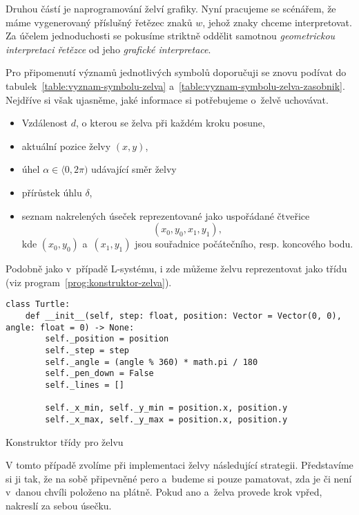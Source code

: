 Druhou částí je naprogramování želví grafiky. Nyní pracujeme se scénářem, že máme vygenerovaný příslušný řetězec znaků $w$, jehož znaky chceme interpretovat. Za účelem jednoduchosti se pokusíme striktně oddělit samotnou \emph{geometrickou interpretaci řetězce} od jeho \emph{grafické interpretace}.

Pro připomenutí významů jednotlivých symbolů doporučuji se znovu podívat do tabulek~\ref{table:vyznam-symbolu-zelva} a~\ref{table:vyznam-symbolu-zelva-zasobnik}. Nejdříve si však ujasněme, jaké informace si potřebujeme o~želvě uchovávat.
\begin{itemize}
    \item Vzdálenost $d$, o kterou se želva při každém kroku posune,
    \item aktuální pozice želvy $(x,y)$,
    \item úhel $\alpha\in\langle 0,2\pi)$ udávající směr želvy
    \item přírůstek úhlu $\delta$,
    \item seznam nakrelených úseček reprezentované jako uspořádané čtveřice
    \[(x_0,y_0,x_1,y_1),\]
    kde $(x_0,y_0)$ a~$(x_1,y_1)$ jsou souřadnice počátečního, resp. koncového bodu.
\end{itemize}
Podobně jako v~případě L-systému, i zde můžeme želvu reprezentovat jako třídu (viz program~\ref{prog:konstruktor-zelva}).
\begin{program}[h]
\begin{lstlisting}[style=python]
class Turtle:
    def __init__(self, step: float, position: Vector = Vector(0, 0), angle: float = 0) -> None:
        self._position = position
        self._step = step
        self._angle = (angle % 360) * math.pi / 180
        self._pen_down = False
        self._lines = []

        self._x_min, self._y_min = position.x, position.y
        self._x_max, self._y_max = position.x, position.y
\end{lstlisting}
    \caption{Konstruktor třídy pro želvu}
    \label{prog:konstruktor-zelva}
\end{program}

V tomto případě zvolíme při implementaci želvy následující strategii. Představíme si ji tak, že na sobě připevněné pero a~budeme si pouze pamatovat, zda je či není v~danou chvíli položeno na plátně. Pokud ano a~želva provede krok vpřed, nakreslí za sebou úsečku.

